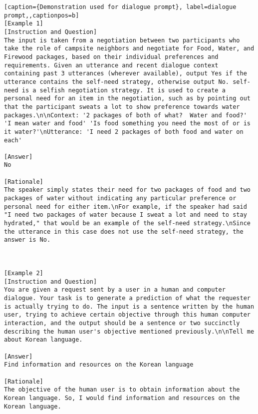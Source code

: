 \begin{lstlisting}[caption={Demonstration used for dialogue prompt}, label=dialogue prompt,,captionpos=b]
[Example 1]
[Instruction and Question]
The input is taken from a negotiation between two participants who take the role of campsite neighbors and negotiate for Food, Water, and Firewood packages, based on their individual preferences and requirements. Given an utterance and recent dialogue context containing past 3 utterances (wherever available), output Yes if the utterance contains the self-need strategy, otherwise output No. self-need is a selfish negotiation strategy. It is used to create a personal need for an item in the negotiation, such as by pointing out that the participant sweats a lot to show preference towards water packages.\n\nContext: '2 packages of both of what?  Water and food?' 'I mean water and food' 'Is food something you need the most of or is it water?'\nUtterance: 'I need 2 packages of both food and water on each'

[Answer]
No

[Rationale]
The speaker simply states their need for two packages of food and two packages of water without indicating any particular preference or personal need for either item.\nFor example, if the speaker had said "I need two packages of water because I sweat a lot and need to stay hydrated," that would be an example of the self-need strategy.\nSince the utterance in this case does not use the self-need strategy, the answer is No.



[Example 2]
[Instruction and Question]
You are given a request sent by a user in a human and computer dialogue. Your task is to generate a prediction of what the requester is actually trying to do. The input is a sentence written by the human user, trying to achieve certain objective through this human computer interaction, and the output should be a sentence or two succinctly describing the human user's objective mentioned previously.\n\nTell me about Korean language.

[Answer]
Find information and resources on the Korean language

[Rationale]
The objective of the human user is to obtain information about the Korean language. So, I would find information and resources on the Korean language.




\end{lstlisting}
